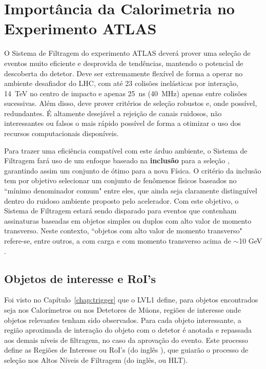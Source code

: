 

\section{Importância da Calorimetria no Experimento ATLAS}

O Sistema de Filtragem  do experimento ATLAS deverá prover uma
seleção de eventos muito eficiente e desprovida de tendências, mantendo o
potencial de descoberta do detetor. Deve ser extremamente flexível de forma a
operar no ambiente desafiador do LHC, com até 23 colisões inelásticas por
interação, 14~TeV no centro de impacto e apenas 25~ns (40~MHz) apenas entre
colisões sucessivas. Além disso, deve prover critérios de seleção robustos e,
onde possível, redundantes. É altamente desejável a rejeição de canais
ruidosos, não interessantes ou falsos o mais rápido possível de forma a
otimizar o uso dos recursos computacionais disponíveis.

Para trazer uma eficiência compatível com este árduo ambiente, o Sistema de
Filtragem fará uso de um enfoque baseado na \textbf{inclusão} para a seleção
, garantindo assim um conjunto de
 ótimo para a nova Física. O critério da inclusão tem por
objetivo selecionar um conjunto de fenômenos físicos baseados no ``mínimo
denominador comum" entre eles, que ainda seja claramente distinguível dentro
do ruidoso ambiente proposto pelo acelerador. Com este objetivo, o Sistema de
Filtragem estará sendo disparado para eventos que contenham assinaturas
baseadas em objetos simples ou duplos com alto valor de momento
transverso. Neste contexto, ``objetos com alto valor de momento transverso"
refere-se, entre outros, a  com carga e com momento transverso acima de
$\sim$10 GeV \cite{hlt-tdr}.

\subsection{Objetos de interesse e RoI's}

Foi visto no Capítulo~\ref{chap:trigger} que o LVL1 define, para objetos
encontrados seja nos Calorímetros ou nos Detetores de Múons, regiões de
interesse onde objetos relevantes tenham sido observados. Para cada objeto
interessante, a região aproximada de interação do objeto com o detetor é
anotada e repassada aos demais níveis de filtragem, no caso da aprovação do
evento. Este processo define as Regiões de Interesse ou RoI's (do inglês
), que guiarão o processo de seleção nos Altos Níveis
de Filtragem (do inglês,  ou HLT).

